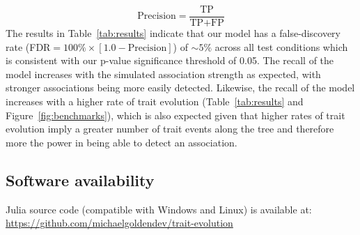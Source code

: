 \documentclass[]{article}
\begin{document}
\begin{equation}
\text{Precision}=\frac{\text{TP}}{\text{TP}+\text{FP}}
\end{equation}
The results in Table~\ref{tab:results} indicate that our model has a false-discovery rate (FDR$=100\% \times [1.0 - \text{Precision}]$) of $\sim5\%$ across all test conditions which is consistent with our p-value significance threshold of 0.05. The recall of the model increases with the simulated association strength as expected, with stronger associations being more easily detected. Likewise, the recall of the model increases with a higher rate of trait evolution (Table~\ref{tab:results} and Figure~\ref{fig:benchmarks}), which is also expected given that higher rates of trait evolution imply a greater number of trait events along the tree and therefore more the power in being able to detect an association.


\subsection*{Software availability}
Julia source code (compatible with Windows and Linux) is available at:\\ \href{https://github.com/michaelgoldendev/trait-evolution}{https://github.com/michaelgoldendev/trait-evolution}

\end{document}
